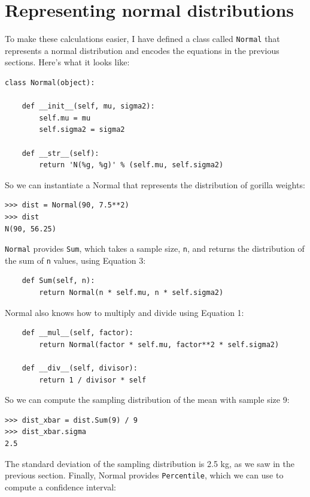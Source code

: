 \documentclass[12pt]{book}
\begin{document}
\section{Representing normal distributions}

To make these calculations easier, I have defined a class called
\verb"Normal" that represents a normal distribution and encodes
the equations in the previous sections.  Here's what it looks
like:

\begin{verbatim}
class Normal(object):

    def __init__(self, mu, sigma2):
        self.mu = mu
        self.sigma2 = sigma2

    def __str__(self):
        return 'N(%g, %g)' % (self.mu, self.sigma2)
\end{verbatim}

So we can instantiate a Normal that represents the distribution
of gorilla weights:

\begin{verbatim}
>>> dist = Normal(90, 7.5**2)
>>> dist
N(90, 56.25)
\end{verbatim}

\verb"Normal" provides \verb"Sum", which takes a sample size, \verb"n",
and returns the distribution of the sum of \verb"n" values, using
Equation 3:

\begin{verbatim}
    def Sum(self, n):
        return Normal(n * self.mu, n * self.sigma2)
\end{verbatim}

Normal also knows how to multiply and divide using
Equation 1:

\begin{verbatim}
    def __mul__(self, factor):
        return Normal(factor * self.mu, factor**2 * self.sigma2)

    def __div__(self, divisor):
        return 1 / divisor * self
\end{verbatim}

So we can compute the sampling distribution of the mean with sample
size 9:

\begin{verbatim}
>>> dist_xbar = dist.Sum(9) / 9
>>> dist_xbar.sigma
2.5
\end{verbatim}

The standard deviation of the sampling distribution is 2.5 kg, as we
saw in the previous section.  Finally, Normal provides \verb"Percentile", which
we can use to compute a confidence interval:
\end{document}
